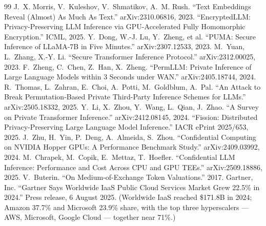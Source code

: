 \documentclass[11pt]{article}
\begin{document}
\begin{thebibliography}{99}
 J.~X. Morris, V.~Kuleshov, V.~Shmatikov, A.~M. Rush. ``Text Embeddings Reveal (Almost) As Much As Text.'' arXiv:2310.06816, 2023.
 ``EncryptedLLM: Privacy-Preserving LLM Inference via GPU-Accelerated Fully Homomorphic Encryption.'' ICML, 2025.
 Y.~Dong, W.-J. Lu, Y.~Zheng, et al. ``PUMA: Secure Inference of LLaMA-7B in Five Minutes.'' arXiv:2307.12533, 2023.
 M.~Yuan, L.~Zhang, X.-Y. Li. ``Secure Transformer Inference Protocol.'' arXiv:2312.00025, 2023.
 F.~Zheng, C.~Chen, Z.~Han, X.~Zheng. ``PermLLM: Private Inference of Large Language Models within 3 Seconds under WAN.'' arXiv:2405.18744, 2024.
 R.~Thomas, L.~Zahran, E.~Choi, A.~Potti, M.~Goldblum, A.~Pal. ``An Attack to Break Permutation-Based Private Third-Party Inference Schemes for LLMs.'' arXiv:2505.18332, 2025.
 Y.~Li, X.~Zhou, Y.~Wang, L.~Qian, J.~Zhao. ``A Survey on Private Transformer Inference.'' arXiv:2412.08145, 2024.
 ``Fission: Distributed Privacy-Preserving Large Language Model Inference.'' IACR ePrint 2025/653, 2025.
 J.~Zhu, H.~Yin, P.~Deng, A.~Almeida, S.~Zhou. ``Confidential Computing on NVIDIA Hopper GPUs: A Performance Benchmark Study.'' arXiv:2409.03992, 2024.
 M.~Chrapek, M.~Copik, E.~Mettaz, T.~Hoefler. ``Confidential LLM Inference: Performance and Cost Across CPU and GPU TEEs.'' arXiv:2509.18886, 2025.
 V.~Buterin. ``On Medium-of-Exchange Token Valuations.'' 2017.
 Gartner, Inc. ``Gartner Says Worldwide IaaS Public Cloud Services Market Grew 22.5\% in 2024.'' Press release, 6 August 2025. (Worldwide IaaS reached \$171.8B in 2024; Amazon 37.7\% and Microsoft 23.9\% share, with the top three hyperscalers --- AWS, Microsoft, Google Cloud --- together near 71\%.)
\end{thebibliography}
\end{document}
